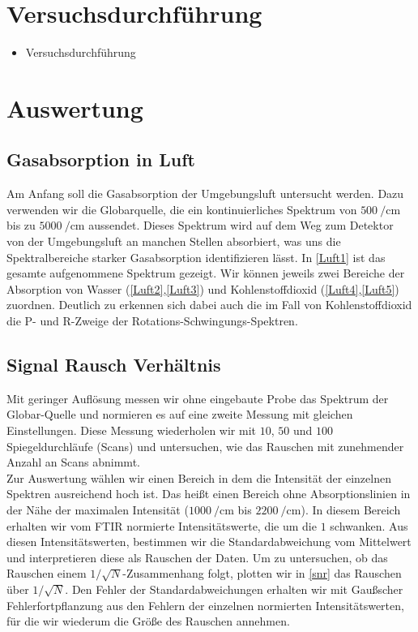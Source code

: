 \documentclass[paper=a4,fontsize=10pt,DIV=18,twocolumn,parskip=half]{scrartcl}
\numberwithin{equation}{section}    %
\begin{document}

\section{Versuchsdurchführung}
\begin{itemize}
\item Versuchsdurchführung
\end{itemize}


\section{Auswertung}

\subsection{Gasabsorption in Luft}
Am Anfang soll die Gasabsorption der Umgebungsluft untersucht werden.  Dazu 
verwenden wir die Globarquelle, die ein kontinuierliches Spektrum von 
$\SI{500}{\per\centi\meter}$ bis zu $\SI{5000}{\per\centi\meter}$ aussendet.  
Dieses Spektrum wird auf dem Weg zum Detektor von der Umgebungsluft an manchen 
Stellen absorbiert, was uns die Spektralbereiche starker Gasabsorption 
identifizieren lässt.
In \ref{Luft1} ist das gesamte aufgenommene Spektrum gezeigt.  Wir können 
jeweils zwei Bereiche der Absorption von Wasser (\ref{Luft2},\ref{Luft3}) und 
Kohlenstoffdioxid (\ref{Luft4},\ref{Luft5}) zuordnen.  Deutlich zu erkennen sich 
dabei auch die im Fall von Kohlenstoffdioxid die P- und R-Zweige der 
Rotations-Schwingungs-Spektren.

\subsection{Signal Rausch Verhältnis}
Mit geringer Auflösung messen wir ohne eingebaute Probe das Spektrum der 
Globar-Quelle und normieren es auf eine zweite Messung mit gleichen 
Einstellungen. Diese Messung wiederholen wir mit $10$, $50$ und $100$ 
Spiegeldurchläufe (Scans) und untersuchen, wie das Rauschen mit zunehmender 
Anzahl an Scans abnimmt.\\
Zur Auswertung wählen wir einen Bereich in dem die Intensität der einzelnen 
Spektren ausreichend hoch ist. Das heißt einen Bereich ohne Absorptionslinien in 
der Nähe der maximalen Intensität ($\SI{1000}{\per\centi\meter}$ bis 
$\SI{2200}{\per\centi\meter}$). In diesem Bereich erhalten wir vom FTIR 
normierte Intensitätswerte, die um die $1$ schwanken. Aus diesen 
Intensitätswerten, bestimmen wir die Standardabweichung vom Mittelwert und 
interpretieren diese als Rauschen der Daten. Um zu untersuchen, ob das Rauschen 
einem $1/\sqrt{N}$-Zusammenhang folgt, plotten wir in \ref{snr} das Rauschen 
über $1/\sqrt{N}$. Den Fehler der Standardabweichungen erhalten wir mit 
Gaußscher Fehlerfortpflanzung aus den Fehlern der einzelnen normierten 
Intensitätswerten, für die wir wiederum die Größe des Rauschen annehmen.
\end{document}
